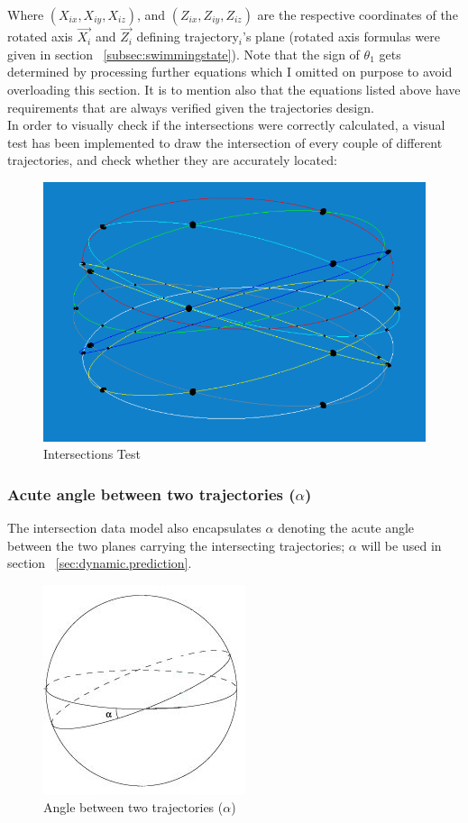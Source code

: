 Where $(X_{ix}, X_{iy}, X_{iz})$, and $(Z_{ix}, Z_{iy}, Z_{iz})$ are the respective coordinates of the rotated axis $\overrightarrow{X_i}$ and $\overrightarrow{Z_i}$ defining trajectory$_i$'s plane (rotated axis formulas were given in section ~\ref{subsec:swimmingstate}). Note that the sign of $\theta_1$ gets determined by processing further equations which I omitted on purpose to avoid overloading this section. It is to mention also that the equations listed above have requirements that are always verified given the trajectories design.\\

In order to visually check if the intersections were correctly calculated, a visual test has been implemented to draw the intersection of every couple of different trajectories, and check whether they are accurately located:

\begin{figure}[H]
   \centering
   \includegraphics[scale=0.5]{figures/intersections.png}
   \caption{Intersections Test}
   \label{fig:intersections}
\end{figure}

\subsubsection{Acute angle between two trajectories ($\alpha$)}
The intersection data model also encapsulates $\alpha$ denoting the acute angle between the two planes carrying the intersecting trajectories; $\alpha$ will be used in section ~\ref{sec:dynamic.prediction}.

\begin{figure}[H]
   \centering
   \includegraphics[scale=1]{figures/angles.jpeg}
   \caption{Angle between two trajectories ($\alpha$)}
   \label{fig:angles}
\end{figure}

